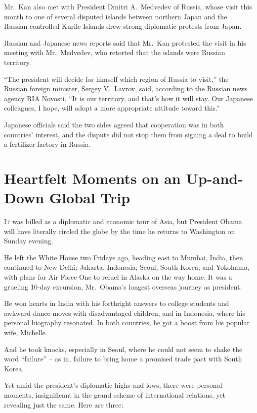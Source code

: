 ﻿\documentclass[12pt]{article}
\begin{document}
Mr.~Kan also met with President Dmitri A.~Medvedev of Russia, whose visit this month to one of
several disputed islands between northern Japan and the Russian-controlled Kurile Islands drew
strong diplomatic protests from Japan.

Russian and Japanese news reports said that Mr.~Kan protested the visit in his meeting with
Mr.~Medvedev, who retorted that the islands were Russian territory.

``The president will decide for himself which region of Russia to visit,'' the Russian foreign
minister, Sergey V.~Lavrov, said, according to the Russian news agency RIA Novosti. ``It is our
territory, and that's how it will stay. Our Japanese colleagues, I hope, will adopt a more
appropriate attitude toward this.''

Japanese officials said the two sides agreed that cooperation was in both countries' interest, and
the dispute did not stop them from signing a deal to build a fertilizer factory in Russia.

\section{Heartfelt Moments on an Up-and-Down Global Trip}

\lettrine{I}{t} was billed as a diplomatic and economic tour of Asia, but
President Obama will have literally circled the globe by the time he returns to Washington on Sunday
evening.

He left the White House two Fridays ago, heading east to Mumbai, India, then continued to New Delhi;
Jakarta, Indonesia; Seoul, South Korea; and Yokohama, with plans for Air Force One to refuel in
Alaska on the way home. It was a grueling 10-day excursion, Mr.~Obama's longest overseas journey as
president.

He won hearts in India with his forthright answers to college students and awkward dance moves with
disadvantaged children, and in Indonesia, where his personal biography resonated. In both countries,
he got a boost from his popular wife, Michelle.

And he took knocks, especially in Seoul, where he could not seem to shake the word ``failure'' -- as
in, failure to bring home a promised trade pact with South Korea.

Yet amid the president's diplomatic highs and lows, there were personal moments, insignificant in
the grand scheme of international relations, yet revealing just the same. Here are three:
\end{document}
